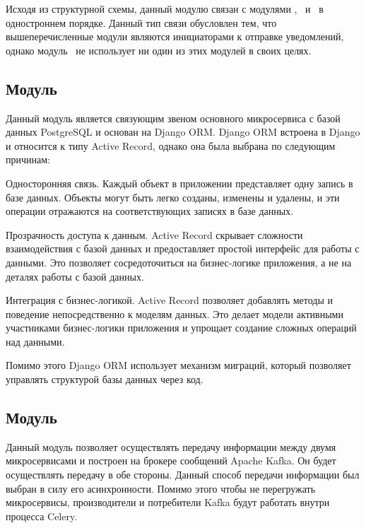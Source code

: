 Исходя из структурной схемы, данный модулю связан с модулями \moduleStripe, \moduleTrading ~и \moduleAutoTrading ~в одностроннем порядке.
Данный тип связи обусловлен тем, что вышеперечисленные модули являются инициаторами к отправке уведомлений,
однако модуль \moduleNotifications ~не использует ни один из этих модулей в своих целях.



\subsection{Модуль \moduleCommunicationPostgres}\label{subsec:sys:module-communication-postgres}
Данный модуль является связующим звеном основного микросервиса с базой данных PostgreSQL и основан на Django ORM.
Django ORM встроена в Django и относится к типу Active Record, однако она была выбрана по следующим причинам:
\begin{enumerate_num}
    \item Односторонняя связь.
    Каждый объект в приложении представляет одну запись в базе данных.
    Объекты могут быть легко созданы, изменены и удалены, и эти операции отражаются на соответствующих записях в базе данных.
    \item Прозрачность доступа к данным.
    Active Record скрывает сложности взаимодействия с базой данных и предоставляет простой интерфейс для работы с данными.
    Это позволяет сосредоточиться на бизнес-логике приложения, а не на деталях работы с базой данных.
    \item Интеграция с бизнес-логикой.
    Active Record позволяет добавлять методы и поведение непосредственно к моделям данных.
    Это делает модели активными участниками бизнес-логики приложения и упрощает создание сложных операций над данными.
\end{enumerate_num}

Помимо этого Django ORM использует механизм миграций, который позволяет управлять структурой базы данных через код.

\subsection{Модуль \moduleCommunication}\label{subsec:sys:module-communication}
Данный модуль позволяет осуществлять передачу информации между двумя микросервисами и построен на брокере сообщений Apache Kafka.
Он будет осуществлять передачу в обе стороны. %
Данный способ передачи информации был выбран в силу его асинхронности.
Помимо этого чтобы не перегружать микросервисы, производители и потребители Kafka будут работать внутри процесса Celery.

